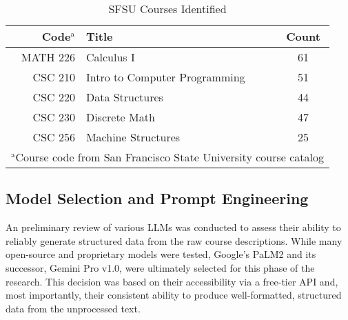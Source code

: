 \begin{table}[tb]
    \captionsetup{skip=5pt}
    \centering
    \caption{SFSU Courses Identified}
    \begin{tabular}{rlc}
        \toprule
        \textbf{Code$^{\mathrm{a}}$} & \textbf{Title}                & \textbf{Count} \\
        \midrule
        MATH 226                     & Calculus I
                                        & 61                                             \\
        CSC 210                      & Intro to Computer Programming
                                        & 51                                             \\
        CSC 220                      & Data Structures
                                        & 44                                             \\
        CSC 230                      & Discrete Math
                                        & 47                                             \\
        CSC 256                      & Machine Structures
                                        & 25                                             \\
        \bottomrule
        \multicolumn{3}{l}{$^{\mathrm{a}}$Course code from San Francisco
            State University course catalog}
    \end{tabular}
    \label{tbl:sfsucourses}
\end{table}

\subsection{Model Selection and Prompt Engineering}\label{ch:3.1.2}
An preliminary review of various LLMs was conducted to assess their ability to reliably generate structured data from the raw course descriptions. While many open-source and proprietary models were tested, Google's PaLM2 and its successor, Gemini Pro v1.0, were ultimately selected for this phase of the research. This decision was based on their accessibility via a free-tier API and, most importantly, their consistent ability to produce well-formatted, structured data from the unprocessed text.

